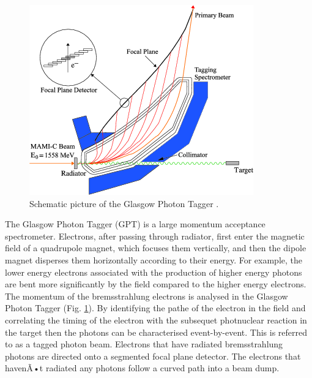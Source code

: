 \begin{figure}[H]
\begin{center}
\includegraphics[scale=0.8]{GlaTagger.png}
\caption{Schematic picture of the Glasgow Photon Tagger \cite{marcu}.}
\label{gpt}
\end{center}
\end{figure}

\indent The Glasgow Photon Tagger (GPT) is a large momentum acceptance spectrometer. Electrons, after passing through radiator, first enter the magnetic field of a quadrupole magnet, which focuses them vertically, and then the dipole magnet disperses them horizontally according to their energy. For example, the lower energy electrons associated with the production of higher energy photons are bent more significantly by the field compared to the higher energy electrons. The momentum of the bremsstrahlung electrons is analysed in the Glasgow Photon Tagger (Fig. \ref{gpt}). By identifying the pathe of the electron in the field and correlating the timing of the electron with the subsequet photnuclear reaction in the target then the photons can be characterised event-by-event. This is referred to as a tagged photon beam. Electrons that have radiated bremsstrahlung photons are directed onto a segmented focal plane detector. The electrons that havenÃ•t radiated any photons follow a curved path into a beam dump.

